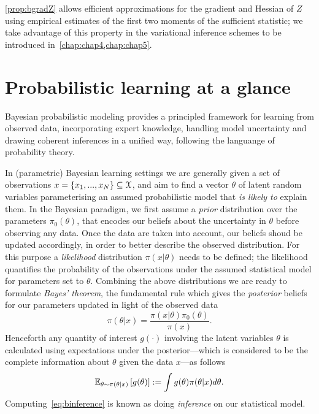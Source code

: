 \cref{prop:bgradZ} allows efficient approximations for the gradient and Hessian of $ Z $ using empirical estimates of the first two moments of the sufficient statistic; we take advantage of this property in the variational inference schemes to be introduced in~\cref{chap:chap4,chap:chap5}.

\section{Probabilistic learning at  a glance}
\label{sec:b-bayesian-inference}

Bayesian probabilistic modeling provides a principled framework for  learning from observed data, incorporating expert knowledge, handling model uncertainty and drawing coherent inferences in a unified way, following the languange of probability theory.

In (parametric) Bayesian learning settings we are generally given a set of observations $x = \{x_1,...,x_N\} \subseteq \mathcal{X}$, and aim to find a vector $\theta $ of latent random variables parameterising an assumed probabilistic model that \emph{is likely to} explain them. In the Bayesian paradigm, we first assume a \emph{prior} distribution over the parameters $\pi_0(\theta)$, that encodes our beliefs about the uncertainty in $\theta$ before observing any data. Once the data are taken into account, our beliefs shoud be updated accordingly, in order to better describe the observed distribution. For this purpose a \emph{likelihood} distribution $\pi(x|\theta)$ needs to be defined; the likelihood quantifies the probability of the observations under the assumed statistical model for parameters set to $\theta$. Combining the above distributions we are ready to formulate \emph{Bayes' theorem}, the fundamental rule which gives the \emph{posterior} beliefs for our parameters updated in light of the observed data
\[
\pi(\theta|x) = \frac{\pi(x|\theta)\pi_0(\theta)}{\pi(x)}.
\label{eq:bbayes-rule}
\] 
Henceforth any quantity of interest $g(\cdot)$ involving the latent variables $\theta$ is calculated using expectations under the posterior---which is considered to be the complete information about $\theta$ given the data $x$---as follows
\[
\mathbb{E}_{\theta \sim \pi(\theta|x)}\left[g(\theta)\right] := \int g(\theta) \pi(\theta|x) d\theta.
\label{eq:binference}
\]
Computing~\cref{eq:binference} is known as doing \emph{inference} on our statistical model.

